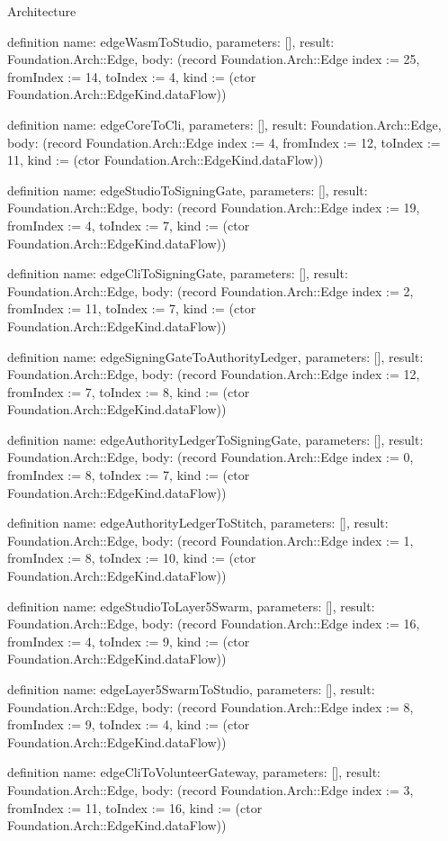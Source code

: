 \begin{lexlean}{Architecture}
\begin{semanticmodule}
definition{
  name: edgeWasmToStudio,
  parameters: [],
  result: Foundation.Arch::Edge,
  body: (record Foundation.Arch::Edge {index := 25, fromIndex := 14, toIndex := 4, kind := (ctor Foundation.Arch::EdgeKind.dataFlow)})
}

definition{
  name: edgeCoreToCli,
  parameters: [],
  result: Foundation.Arch::Edge,
  body: (record Foundation.Arch::Edge {index := 4, fromIndex := 12, toIndex := 11, kind := (ctor Foundation.Arch::EdgeKind.dataFlow)})
}

definition{
  name: edgeStudioToSigningGate,
  parameters: [],
  result: Foundation.Arch::Edge,
  body: (record Foundation.Arch::Edge {index := 19, fromIndex := 4, toIndex := 7, kind := (ctor Foundation.Arch::EdgeKind.dataFlow)})
}

definition{
  name: edgeCliToSigningGate,
  parameters: [],
  result: Foundation.Arch::Edge,
  body: (record Foundation.Arch::Edge {index := 2, fromIndex := 11, toIndex := 7, kind := (ctor Foundation.Arch::EdgeKind.dataFlow)})
}

definition{
  name: edgeSigningGateToAuthorityLedger,
  parameters: [],
  result: Foundation.Arch::Edge,
  body: (record Foundation.Arch::Edge {index := 12, fromIndex := 7, toIndex := 8, kind := (ctor Foundation.Arch::EdgeKind.dataFlow)})
}

definition{
  name: edgeAuthorityLedgerToSigningGate,
  parameters: [],
  result: Foundation.Arch::Edge,
  body: (record Foundation.Arch::Edge {index := 0, fromIndex := 8, toIndex := 7, kind := (ctor Foundation.Arch::EdgeKind.dataFlow)})
}

definition{
  name: edgeAuthorityLedgerToStitch,
  parameters: [],
  result: Foundation.Arch::Edge,
  body: (record Foundation.Arch::Edge {index := 1, fromIndex := 8, toIndex := 10, kind := (ctor Foundation.Arch::EdgeKind.dataFlow)})
}

definition{
  name: edgeStudioToLayer5Swarm,
  parameters: [],
  result: Foundation.Arch::Edge,
  body: (record Foundation.Arch::Edge {index := 16, fromIndex := 4, toIndex := 9, kind := (ctor Foundation.Arch::EdgeKind.dataFlow)})
}

definition{
  name: edgeLayer5SwarmToStudio,
  parameters: [],
  result: Foundation.Arch::Edge,
  body: (record Foundation.Arch::Edge {index := 8, fromIndex := 9, toIndex := 4, kind := (ctor Foundation.Arch::EdgeKind.dataFlow)})
}

definition{
  name: edgeCliToVolunteerGateway,
  parameters: [],
  result: Foundation.Arch::Edge,
  body: (record Foundation.Arch::Edge {index := 3, fromIndex := 11, toIndex := 16, kind := (ctor Foundation.Arch::EdgeKind.dataFlow)})
}


\end{semanticmodule}
\end{lexlean}
